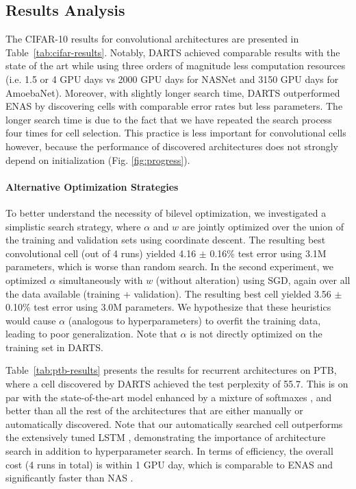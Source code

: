 \documentclass{article}
\begin{document}
\subsection{Results Analysis}
The CIFAR-10 results for convolutional architectures are presented in Table~\ref{tab:cifar-results}.
Notably,
DARTS achieved comparable results with the state of the art
\citep{zoph2017learning, real2018regularized}
while using three orders of magnitude less computation resources
(i.e. 1.5 or 4 GPU days vs 2000 GPU days for NASNet and 3150 GPU days for AmoebaNet).
Moreover,
with slightly longer search time,
DARTS outperformed ENAS \citep{pham2018efficient}
by discovering cells with comparable error rates but less parameters.
The longer search time is due to the fact that we have repeated the search process four times for cell selection.
This practice is less important for convolutional cells however,
because the performance of discovered architectures does not strongly depend on initialization (Fig. \ref{fig:progress}).

\paragraph{Alternative Optimization Strategies} To better understand the necessity of bilevel optimization,
we investigated a simplistic search strategy, where $\alpha$ and $w$ are jointly optimized over the union of the training and validation sets using coordinate descent.
The resulting best convolutional cell (out of 4 runs) yielded 4.16 $\pm$ 0.16\% test error using 3.1M parameters,
which is worse than random search.
In the second experiment, we optimized $\alpha$ simultaneously with $w$ (without alteration) using SGD,
again over
all the data available (training + validation). The resulting best cell yielded 3.56 $\pm$ 0.10\% test error using 3.0M parameters. 
We hypothesize that these heuristics would cause $\alpha$ (analogous to hyperparameters) to overfit the training data,
leading to poor generalization.
Note that $\alpha$ is not directly optimized on the training set in DARTS.

Table~\ref{tab:ptb-results} presents the results for recurrent architectures on PTB,
where a cell discovered by DARTS achieved the test perplexity of 55.7.
This is on par with the state-of-the-art model enhanced by a mixture of softmaxes \citep{yang2017breaking},
and better than all the rest of the  architectures that are either manually or automatically discovered.
Note that our automatically searched cell outperforms the extensively tuned LSTM \citep{melis2017state},
demonstrating the importance of architecture search in addition to hyperparameter search.
In terms of efficiency,
the overall cost (4 runs in total) is within 1 GPU day,
which is comparable to ENAS and significantly faster than NAS \citep{zoph2016neural}.
\end{document}
